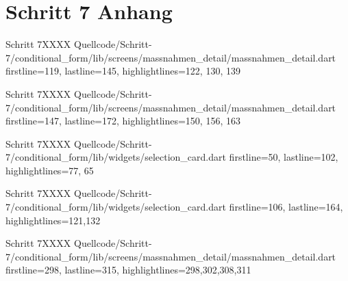 \section{Schritt 7 Anhang}
\label{appendix:Schritt7Anhang}


\begin{alexlisting}{Schritt 7}{XXXX}
    {Quellcode/Schritt-7/conditional_form/lib/screens/massnahmen_detail/massnahmen_detail.dart}
    {firstline=119, lastline=145, highlightlines={122, 130, 139}}
    \label{lst:Schritt7buildSelectionCard}
\end{alexlisting}


\begin{alexlisting}{Schritt 7}{XXXX}
    {Quellcode/Schritt-7/conditional_form/lib/screens/massnahmen_detail/massnahmen_detail.dart}
    {firstline=147, lastline=172, highlightlines={150, 156, 163}}
    \label{lst:Schritt7buildMultiSelectionCard}
\end{alexlisting}


\begin{alexlisting}{Schritt 7}{XXXX}
    {Quellcode/Schritt-7/conditional_form/lib/widgets/selection_card.dart}
    {firstline=50, lastline=102, highlightlines={77, 65}}
    \label{lst:Schritt7validityChangedStreamBuilderChoiceMatcher}
\end{alexlisting}



\begin{alexlisting}{Schritt 7}{XXXX}
    {Quellcode/Schritt-7/conditional_form/lib/widgets/selection_card.dart}
    {firstline=106, lastline=164, highlightlines={121,132}}
    \label{lst:Schritt7createMultipleChoiceSelectionScreenChoiceMatcher}
\end{alexlisting}

\begin{alexlisting}{Schritt 7}{XXXX}
    {Quellcode/Schritt-7/conditional_form/lib/screens/massnahmen_detail/massnahmen_detail.dart}
    {firstline=298, lastline=315, highlightlines={298,302,308,311}}
    \label{lst:Schritt7validateChoices}
\end{alexlisting}